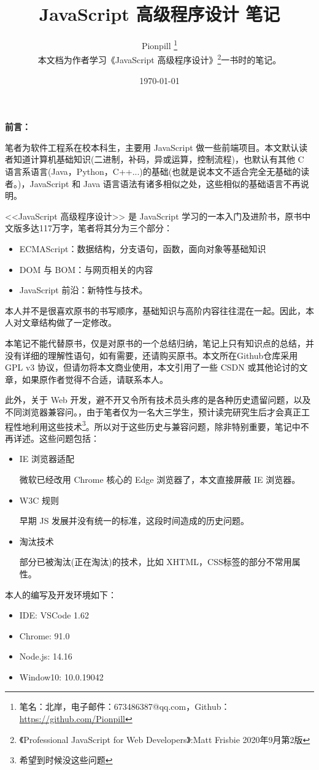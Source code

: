 \documentclass{PionpillNote-book}
\title{JavaScript 高级程序设计 笔记}
\author{
    Pionpill \footnote{笔名：北岸，电子邮件：673486387@qq.com，Github：\url{https://github.com/Pionpill}} \\
    本文档为作者学习《JavaScript 高级程序设计》\footnote{《Professional JavaScript for Web Developers》:Matt Frisbie 2020年9月第2版}一书时的笔记。\\
}
\date{\today}
\begin{document}
\pagestyle{plain}
\maketitle

\noindent\textbf{前言：}

笔者为软件工程系在校本科生，主要用 JavaScript 做一些前端项目。本文默认读者知道计算机基础知识(二进制，补码，异或运算，控制流程)，也默认有其他 C 语言系语言(Java，Python，C++...)的基础(也就是说本文不适合完全无基础的读者。)，JavaScript 和 Java 语言语法有诸多相似之处，这些相似的基础语言不再说明。

<<JavaScript 高级程序设计>> 是 JavaScript 学习的一本入门及进阶书，原书中文版多达117万字，笔者将其分为三个部分：
\begin{itemize}
    \item ECMAScript：数据结构，分支语句，函数，面向对象等基础知识
    \item DOM 与 BOM：与网页相关的内容
    \item JavaScript 前沿：新特性与技术。
\end{itemize}

本人并不是很喜欢原书的书写顺序，基础知识与高阶内容往往混在一起。因此，本人对文章结构做了一定修改。

本笔记不能代替原书，仅是对原书的一个总结归纳，笔记上只有知识点的总结，并没有详细的理解性语句，如有需要，还请购买原书。本文所在Github仓库采用 GPL v3 协议，但请勿将本文商业使用，本文引用了一些 CSDN 或其他论讨的文章，如果原作者觉得不合适，请联系本人。

此外，关于 Web 开发，避不开又令所有技术员头疼的是各种历史遗留问题，以及不同浏览器兼容问。，由于笔者仅为一名大三学生，预计读完研究生后才会真正工程性地利用这些技术\footnote{希望到时候没这些问题}。所以对于这些历史与兼容问题，除非特别重要，笔记中不再详述。这些问题包括：
\begin{itemize}
    \item IE 浏览器适配
    
    微软已经改用 Chrome 核心的 Edge 浏览器了，本文直接屏蔽 IE 浏览器。
    \item W3C 规则
    
    早期 JS 发展并没有统一的标准，这段时间造成的历史问题。
    \item 淘汰技术
    
    部分已被淘汰(正在淘汰)的技术，比如 XHTML，CSS标签的部分不常用属性。
\end{itemize}

本人的编写及开发环境如下：
\begin{itemize}
    \item IDE: VSCode 1.62
    \item Chrome: 91.0
    \item Node.js: 14.16
    \item Window10: 10.0.19042
\end{itemize}
\end{document}
